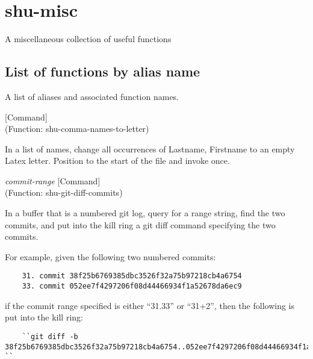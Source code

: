 \eject
\section{shu-misc}



A miscellaneous collection of useful functions


\subsection{List of functions by alias name}

A list of aliases and associated function names.



\vspace{1em}
\noindent
{}
\usebox{\funcname}
 \hfill [Command]\\%
 (Function: shu-comma-names-to-letter)

\begin{doc-string}
In a list of names, change all occurrences
of Lastname, Firstname to an empty Latex letter.
Position to the start of the file and invoke once.
\end{doc-string}

\vspace{1em}
\noindent
{}
\usebox{\funcname}\emph{commit-range}
 \hfill [Command]\\%
 (Function: shu-git-diff-commits)

\begin{doc-string}
In a buffer that is a numbered git log, query for a range string, find the two
commits, and put into the kill ring a git diff command specifying the two commits.

For example, given the following two numbered commits:

\small{\begin{verbatim}
    31. commit 38f25b6769385dbc3526f32a75b97218cb4a6754
    33. commit 052ee7f4297206f08d44466934f1a52678da6ec9
\end{verbatim}}

if the commit range specified is either ``31.33'' or ``31+2'', then the following
is put into the kill ring:

\small{\begin{verbatim}
    ``git diff -b 38f25b6769385dbc3526f32a75b97218cb4a6754..052ee7f4297206f08d44466934f1a52678da6ec9 ``
\end{verbatim}}
\end{doc-string}

